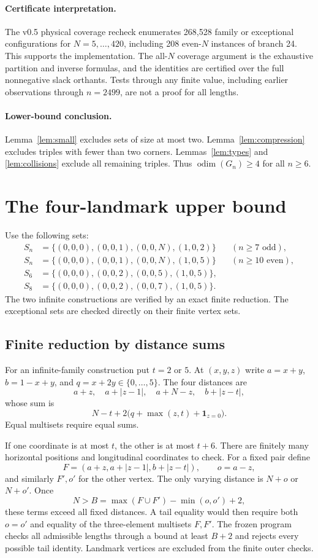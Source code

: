 \documentclass[11pt,a4paper]{article}
\newcommand{\odim}{\operatorname{odim}}
\begin{document}
\paragraph{Certificate interpretation.}
The v0.5 physical coverage recheck enumerates 268,528 family or exceptional configurations for $N=5,\ldots,420$, including 208 even-$N$ instances of branch 24. This supports the implementation. The all-$N$ coverage argument is the exhaustive partition and inverse formulas, and the identities are certified over the full nonnegative slack orthants. Tests through any finite value, including earlier observations through $n=2499$, are not a proof for all lengths.

\paragraph{Lower-bound conclusion.}
Lemma~\ref{lem:small} excludes sets of size at most two. Lemma~\ref{lem:compression} excludes triples with fewer than two corners. Lemmas~\ref{lem:types} and \ref{lem:collisions} exclude all remaining triples. Thus $\odim(G_n)\ge4$ for all $n\ge6$.

\section{The four-landmark upper bound}
Use the following sets:
\begin{align*}
S_n&=\{(0,0,0),(0,0,1),(0,0,N),(1,0,2)\} &&(n\ge7\text{ odd}),\\
S_n&=\{(0,0,0),(0,0,1),(0,0,N),(1,0,5)\} &&(n\ge10\text{ even}),\\
S_6&=\{(0,0,0),(0,0,2),(0,0,5),(1,0,5)\},\\
S_8&=\{(0,0,0),(0,0,2),(0,0,7),(1,0,5)\}.
\end{align*}
The two infinite constructions are verified by an exact finite reduction. The exceptional sets are checked directly on their finite vertex sets.

\subsection{Finite reduction by distance sums}
For an infinite-family construction put $t=2$ or $5$. At $(x,y,z)$ write $a=x+y$, $b=1-x+y$, and $q=x+2y\in\{0,\ldots,5\}$. The four distances are
\[
a+z,\quad a+|z-1|,\quad a+N-z,\quad b+|z-t|,
\]
whose sum is
\[
N-t+2\bigl(q+\max(z,t)+\mathbf1_{z=0}\bigr).
\]
Equal multisets require equal sums.

If one coordinate is at most $t$, the other is at most $t+6$. There are finitely many horizontal positions and longitudinal coordinates to check. For a fixed pair define
\[
F=(a+z,a+|z-1|,b+|z-t|),\qquad o=a-z,
\]
and similarly $F',o'$ for the other vertex. The only varying distance is $N+o$ or $N+o'$. Once
\[
N>B=\max(F\cup F')-\min(o,o')+2,
\]
these terms exceed all fixed distances. A tail equality would then require both $o=o'$ and equality of the three-element multisets $F,F'$. The frozen program checks all admissible lengths through a bound at least $B+2$ and rejects every possible tail identity. Landmark vertices are excluded from the finite outer checks.
\end{document}
